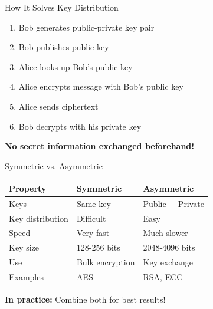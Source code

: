 \documentclass{beamer}
\begin{document}
\begin{frame}{How It Solves Key Distribution}
\begin{enumerate}
    \item Bob generates public-private key pair
    \item Bob publishes public key
    \item Alice looks up Bob's public key
    \item Alice encrypts message with Bob's public key
    \item Alice sends ciphertext
    \item Bob decrypts with his private key
\end{enumerate}

\vspace{0.3cm}
\textbf{No secret information exchanged beforehand!}

\end{frame}

\begin{frame}{Symmetric vs. Asymmetric}
\begin{center}
\begin{tabular}{|l|l|l|}
\hline
\textbf{Property} & \textbf{Symmetric} & \textbf{Asymmetric} \\
\hline
Keys & Same key & Public + Private \\
Key distribution & Difficult & Easy \\
Speed & Very fast & Much slower \\
Key size & 128-256 bits & 2048-4096 bits \\
Use & Bulk encryption & Key exchange \\
Examples & AES & RSA, ECC \\
\hline
\end{tabular}
\end{center}

\vspace{0.3cm}
\textbf{In practice:} Combine both for best results!
\end{frame}
\end{document}
